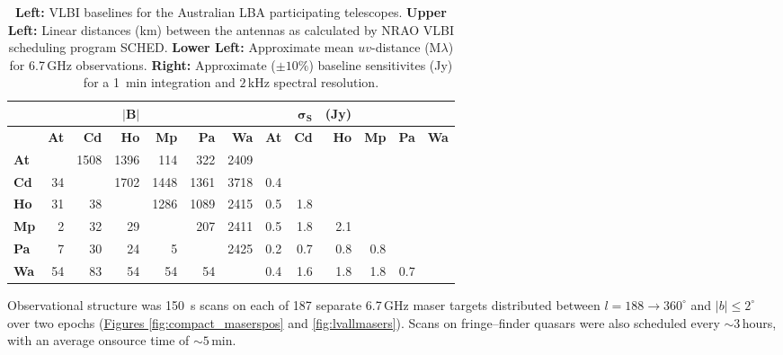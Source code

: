 {\begin{table}[t]
{\begin{tabular}{l|c|ccccccr}
            \bottomrule
        \end{tabular}}
    \end{table}
    \begin{table}[t]
        \centering
        \caption[V534 LBA baselines]{{\bf Left:} VLBI baselines for the Australian LBA participating telescopes. {\bf Upper Left:} Linear distances (km) between the antennas as calculated by NRAO VLBI scheduling program SCHED. {\bf Lower Left:} Approximate mean $uv$-distance (M$\lambda$) for 6.7\,GHz  observations. {\bf Right:} Approximate ($\pm10\%$) baseline sensitivites (Jy) for a 1~min integration and $2$\,kHz spectral resolution. }
        \label{tab:baseline_table}
        {\onehalfspacing\small
        \begin{tabular}{l| rrrrrr | rrrrrr}
            \toprule
            \hline
                    &        &        &$|\textbf{B}|$&&        &         &        &$\boldsymbol{\sigma_S}$&\textbf{(Jy)}&        &   \\\hline
		            &{\bf At}&{\bf Cd}&{\bf Ho}		 &{\bf Mp}&{\bf Pa}&{\bf Wa}& {\bf At}&{\bf Cd}&{\bf Ho}			   &{\bf Mp}    &{\bf Pa}&{\bf Wa}\\\hline
            {\bf At}&        &  1508  & 1396   		 &  114   &  322   & 2409   &         &        &        			   &            &        &   \\
            {\bf Cd}&   34   &        & 1702   		 & 1448   & 1361   & 3718   &   0.4   &        &        			   &            &        &   \\
            {\bf Ho}&   31   &    38  &        		 & 1286   & 1089   & 2415   &   0.5   & 1.8    &        			   &            &        &   \\
            {\bf Mp}&    2   &    32  &   29   		 &        &  207   & 2411   &   0.5   & 1.8    & 2.1    			   &            &        &   \\
            {\bf Pa}&    7   &    30  &   24   		 &    5   &        & 2425   &   0.2   & 0.7    & 0.8    			   & 0.8        &        &   \\
            {\bf Wa}&   54   &    83  &   54   		 &   54   &   54   &        &   0.4   & 1.6    & 1.8    			   & 1.8        & 0.7    &   \\ 
            \bottomrule 
        \end{tabular}}
    \end{table}
    }
    
    Observational structure was 150~s scans on each of 187 separate 6.7\,GHz maser targets distributed between $l=188\rightarrow360^\circ$ and $|b|\le2^\circ$ over two epochs (\hyperref[fig:compact_maserspos]{Figures \ref*{fig:compact_maserspos}} and \ref{fig:lvallmasers}). Scans on fringe--finder quasars were also scheduled every $\sim3$\,hours, with an average onsource time of $\sim5$\,min.
    
